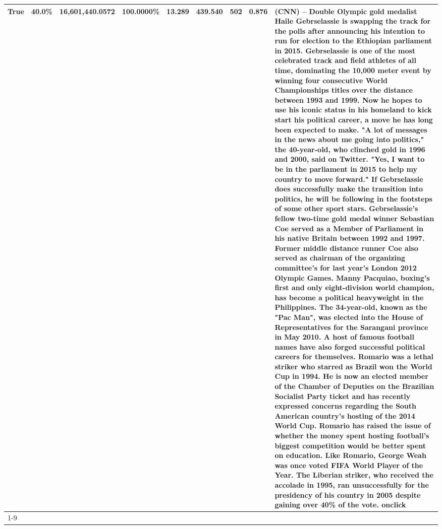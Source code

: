 \begin{table}[H]
{\begin{tabular}{lllrlllll}
True & 40.0\% & 16,601,440.0572 & \bfseries \color{red} 100.0000\% & 13.289 & 439.540 & 502 & 0.876 & (CNN) -- Double Olympic gold medalist Haile Gebrselassie is swapping the track for the polls after announcing his intention to run for election to the Ethiopian parliament in 2015. Gebrselassie is one of the most celebrated track and field athletes of all time, dominating the 10,000 meter event by winning four consecutive World Championships titles over the distance between 1993 and 1999. Now he hopes to use his iconic status in his homeland to kick start his political career, a move he has long been expected to make. "A lot of messages in the news about me going into politics," the 40-year-old, who clinched gold in 1996 and 2000, said on Twitter. "Yes, I want to be in the parliament in 2015 to help my country to move forward." If Gebrselassie does successfully make the transition into politics, he will be following in the footsteps of some other sport stars. Gebrselassie's fellow two-time gold medal winner Sebastian Coe served as a Member of Parliament in his native Britain between 1992 and 1997. Former middle distance runner Coe also served as chairman of the organizing committee's for last year's London 2012 Olympic Games. Manny Pacquiao, boxing's first and only eight-division world champion, has become a political heavyweight in the Philippines. The 34-year-old, known as the "Pac Man", was elected into the House of Representatives for the Sarangani province in May 2010. A host of famous football names have also forged successful political careers for themselves. Romario was a lethal striker who starred as Brazil won the World Cup in 1994. He is now an elected member of the Chamber of Deputies on the Brazilian Socialist Party ticket and has recently expressed concerns regarding the South American country's hosting of the 2014 World Cup. Romario has raised the issue of whether the money spent hosting football's biggest competition would be better spent on education. Like Romario, George Weah was once voted FIFA World Player of the Year. The Liberian striker, who received the accolade in 1995, ran unsuccessfully for the presidency of his country in 2005 despite gaining over 40\% of the vote. onclick \\
\cline{1-9}

\end{tabular}}
\end{table}
